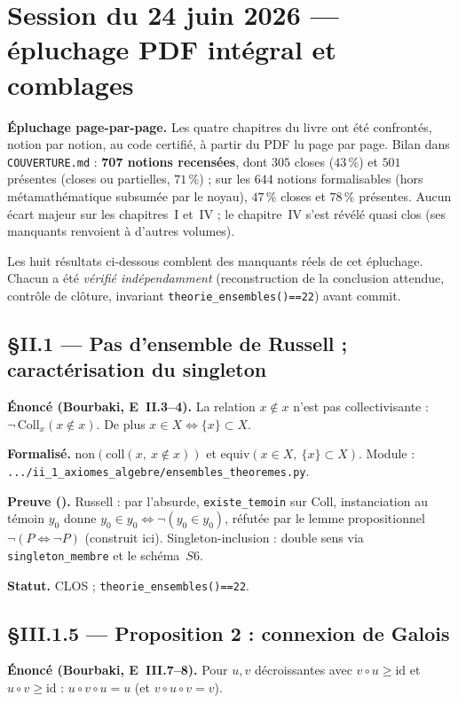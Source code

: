\section{Session du 24 juin 2026 --- épluchage PDF intégral et comblages}

\textbf{Épluchage page-par-page.} Les quatre chapitres du livre ont été confrontés,
notion par notion, au code certifié, à partir du PDF lu page par page. Bilan dans
\texttt{COUVERTURE.md} : \textbf{707 notions recensées}, dont $305$ closes ($43\,\%$)
et $501$ présentes (closes ou partielles, $71\,\%$) ; sur les $644$ notions
formalisables (hors métamathématique subsumée par le noyau), $47\,\%$ closes et
$78\,\%$ présentes. Aucun écart majeur sur les chapitres~I et~IV ; le chapitre~IV
s'est révélé quasi clos (ses manquants renvoient à d'autres volumes).

Les huit résultats ci-dessous comblent des manquants réels de cet épluchage. Chacun
a été \emph{vérifié indépendamment} (reconstruction de la conclusion attendue,
contrôle de clôture, invariant \texttt{theorie\_ensembles()==22}) avant commit.

\subsection{§II.1 --- Pas d'ensemble de Russell ; caractérisation du singleton}
\textbf{Énoncé (Bourbaki, E~II.3--4).} La relation $x\notin x$ n'est pas
collectivisante : $\neg\,\mathrm{Coll}_x(x\notin x)$. De plus
$x\in X \Leftrightarrow \{x\}\subset X$.

\textbf{Formalisé.} $\mathrm{non}(\mathrm{coll}(x,\ x\notin x))$ et
$\mathrm{equiv}(x\in X,\ \{x\}\subset X)$.
Module : \texttt{.../ii\_1\_axiomes\_algebre/ensembles\_theoremes.py}.

\textbf{Preuve (\Nstar).} Russell : par l'absurde, \texttt{existe\_temoin} sur
$\mathrm{Coll}$, instanciation au témoin $y_0$ donne $y_0\in y_0\Leftrightarrow\neg(y_0\in y_0)$,
réfutée par le lemme propositionnel $\neg(P\Leftrightarrow\neg P)$ (construit ici).
Singleton-inclusion : double sens via \texttt{singleton\_membre} et le schéma~$S6$.

\textbf{Statut.} CLOS ; \texttt{theorie\_ensembles()==22}.

\subsection{§III.1.5 --- Proposition 2 : connexion de Galois}
\textbf{Énoncé (Bourbaki, E~III.7--8).} Pour $u,v$ décroissantes avec $v\circ u\geq\mathrm{id}$
et $u\circ v\geq\mathrm{id}$ : $u\circ v\circ u = u$ (et $v\circ u\circ v = v$).

